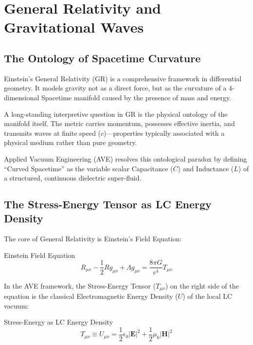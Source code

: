 \chapter{General Relativity and Gravitational Waves}
\label{ch:general_relativity}

\section{The Ontology of Spacetime Curvature}
Einstein's General Relativity (GR) is a comprehensive framework in differential geometry. It models gravity not as a direct force, but as the curvature of a 4-dimensional Spacetime manifold caused by the presence of mass and energy. 

A long-standing interpretive question in GR is the physical ontology of the manifold itself. The metric carries momentum, possesses effective inertia, and transmits waves at finite speed ($c$)---properties typically associated with a physical medium rather than pure geometry.

Applied Vacuum Engineering (AVE) resolves this ontological paradox by defining ``Curved Spacetime'' as the variable scalar Capacitance ($C$) and Inductance ($L$) of a structured, continuous dielectric super-fluid.

\section{The Stress-Energy Tensor as LC Energy Density}
The core of General Relativity is Einstein's Field Equation:
\begin{resultbox}{Einstein Field Equation}
\begin{equation}
    R_{\mu\nu} - \frac{1}{2}R g_{\mu\nu} + \Lambda g_{\mu\nu} = \frac{8\pi G}{c^4} T_{\mu\nu}
\end{equation}
\end{resultbox}

In the AVE framework, the Stress-Energy Tensor ($T_{\mu\nu}$) on the right side of the equation is the classical Electromagnetic Energy Density ($U$) of the local LC vacuum:
\begin{resultbox}{Stress-Energy as LC Energy Density}
\begin{equation}
    T_{\mu\nu} \equiv U_{\mu\nu} = \frac{1}{2}\epsilon_0 |\mathbf{E}|^2 + \frac{1}{2}\mu_0 |\mathbf{H}|^2
\end{equation}
\end{resultbox}


